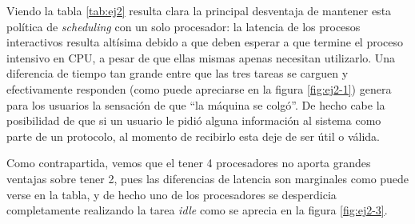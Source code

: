 Viendo la tabla \ref{tab:ej2} resulta clara la principal desventaja de mantener esta política de \emph{scheduling} con un solo procesador: la latencia de los procesos interactivos resulta altísima debido a que deben esperar a que termine el proceso intensivo en CPU, a pesar de que ellas mismas apenas necesitan utilizarlo. Una diferencia de tiempo tan grande entre que las tres tareas se carguen y efectivamente responden (como puede apreciarse en la figura \ref{fig:ej2-1}) genera para los usuarios la sensación de que ``la máquina se colgó''. De hecho cabe la posibilidad de que si un usuario le pidió alguna información al sistema como parte de un protocolo, al momento de recibirlo esta deje de ser útil o válida.   

Como contrapartida, vemos que el tener 4 procesadores no aporta grandes ventajas sobre tener 2, pues las diferencias de latencia son marginales como puede verse en la tabla, y de hecho uno de los procesadores se desperdicia completamente realizando la tarea \emph{idle} como se aprecia en la figura \ref{fig:ej2-3}.
 


